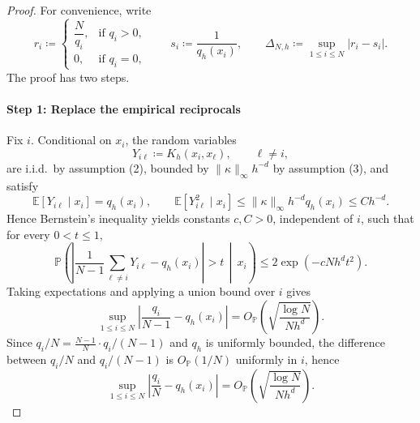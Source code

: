 \documentclass[a4paper,11pt, DIV=10]{scrartcl}
\numberwithin{equation}{section}
\theoremstyle{definition}
\theoremstyle{remark}
\begin{document}
\begin{proof}
For convenience, write
\begin{equation}
r_i\coloneq
\begin{cases}
\dfrac{N}{q_i}, & \text{if } q_i>0,\\[0.8ex]
0, & \text{if } q_i=0,
\end{cases}
\qquad
s_i\coloneq \frac{1}{q_h(x_i)},
\qquad
\Delta_{N,h}\coloneq \sup_{1\le i\le N}|r_i-s_i|.
\end{equation}
The proof has two steps.

\paragraph{Step 1: Replace the empirical reciprocals}
Fix $i$. Conditional on $x_i$, the random variables
\begin{equation}
Y_{i\ell}\coloneq K_h(x_i,x_\ell),
\qquad
\ell\neq i,
\end{equation}
are i.i.d.\ by assumption \textup{(2)}, bounded by $\|\kappa\|_\infty h^{-d}$ by assumption \textup{(3)}, and satisfy
\begin{equation}
\mathbb E[Y_{i\ell}\mid x_i]=q_h(x_i),
\qquad
\mathbb E[Y_{i\ell}^2\mid x_i]\le \|\kappa\|_\infty h^{-d}q_h(x_i)\le Ch^{-d}.
\end{equation}
Hence Bernstein's inequality yields constants $c,C>0$, independent of $i$, such that for every $0<t\le 1$,
\begin{equation}
\label{eq:conditional-bernstein}
\mathbb P\!\left(
\left|
\frac{1}{N-1}\sum_{\ell\neq i}Y_{i\ell}-q_h(x_i)
\right|>t \,\middle|\, x_i
\right)
\le
2\exp\!\left(-cNh^dt^2\right).
\end{equation}
Taking expectations and applying a union bound over $i$ gives
\begin{equation}
\label{eq:q-over-n-minus-one}
\sup_{1\le i\le N}
\left|
\frac{q_i}{N-1}-q_h(x_i)
\right|
=
O_{\mathbb P}\!\left(\sqrt{\frac{\log N}{N h^d}}\right).
\end{equation}
Since $q_i/N=\frac{N-1}{N}\cdot q_i/(N-1)$ and $q_h$ is uniformly bounded, the difference between $q_i/N$ and $q_i/(N-1)$ is $O_{\mathbb P}(1/N)$ uniformly in $i$, hence
\begin{equation}
\label{eq:q-over-n}
\sup_{1\le i\le N}
\left|
\frac{q_i}{N}-q_h(x_i)
\right|
=
O_{\mathbb P}\!\left(\sqrt{\frac{\log N}{N h^d}}\right).
\end{equation}


\end{proof}
\end{document}

